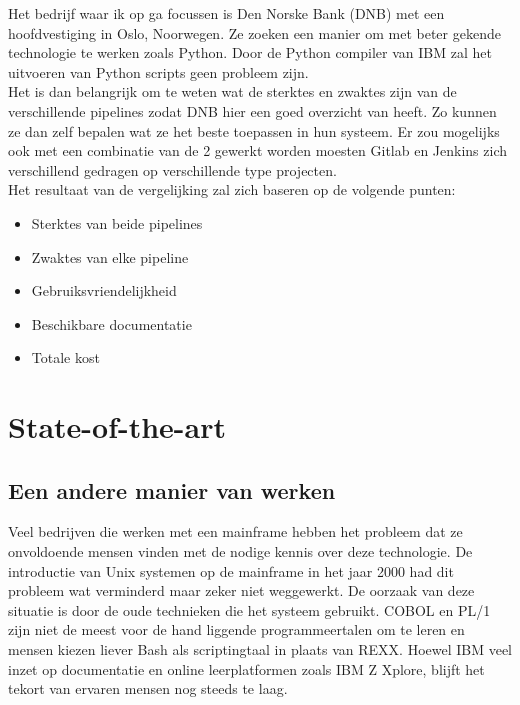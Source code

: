 Het bedrijf waar ik op ga focussen is Den Norske Bank (DNB) met een hoofdvestiging in Oslo, Noorwegen. Ze zoeken een manier om met beter gekende technologie te werken zoals Python. Door de Python compiler van IBM zal het uitvoeren van Python scripts geen probleem zijn. \\
Het is dan belangrijk om te weten wat de sterktes en zwaktes zijn van de verschillende pipelines zodat DNB hier een goed overzicht van heeft. Zo kunnen ze dan zelf bepalen wat ze het beste toepassen in hun systeem. Er zou mogelijks ook met een combinatie van de 2 gewerkt worden moesten Gitlab en Jenkins zich verschillend gedragen op verschillende type projecten. \\

Het resultaat van de vergelijking zal zich baseren op de volgende punten:
\begin{itemize}
    \item Sterktes van beide pipelines
    \item Zwaktes van elke pipeline
    \item Gebruiksvriendelijkheid
    \item Beschikbare documentatie
    \item Totale kost
\end{itemize}


\section{State-of-the-art}%
\label{sec:state-of-the-art}

\subsection{Een andere manier van werken}
Veel bedrijven die werken met een mainframe hebben het probleem dat ze onvoldoende mensen vinden met de nodige kennis over deze technologie. De introductie van Unix systemen op de mainframe in het jaar 2000 \autocite{Mertic2020} had dit probleem wat verminderd maar zeker niet weggewerkt. De oorzaak van deze situatie is door de oude technieken die het systeem gebruikt. COBOL en PL/1 zijn niet de meest voor de hand liggende programmeertalen om te leren en mensen kiezen liever Bash als scriptingtaal in plaats van REXX. Hoewel IBM veel inzet op documentatie en online leerplatformen zoals IBM Z Xplore, blijft het tekort van ervaren mensen nog steeds te laag. \\

